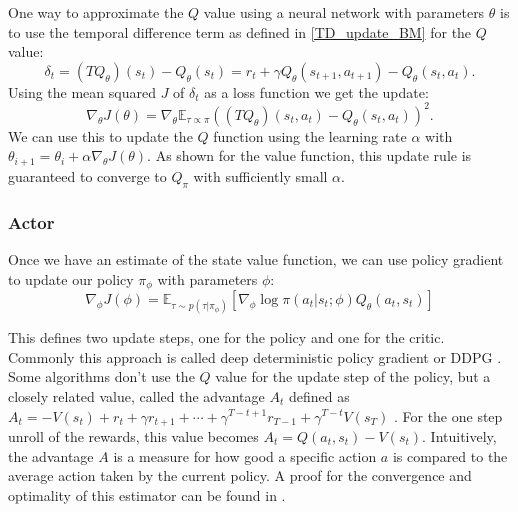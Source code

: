 One way to approximate the $Q$ value using a neural network with parameters $\theta$ is to use the temporal difference term as defined in \ref{TD_update_BM} for the $Q$ value:
\begin{equation}
    \label{Q-ValueTD}
    \delta_t = (T Q_{\theta})(s_t) - Q_{\theta}(s_t) = r_t + \gamma Q_{\theta}(s_{t+1}, a_{t+1}) - Q_{\theta}(s_{t}, a_{t}).
\end{equation}
Using the mean squared $J$ of $\delta_t$ as a loss function we get the update:
\begin{equation}
    \nabla_{\theta} J(\theta) = \nabla_{\theta} \mathbb{E}_{\tau \propto \pi}((T Q_{\theta})(s_t, a_t) - Q_{\theta}(s_t, a_t))^2.
\end{equation}
We can use this to update the $Q$ function using the learning rate $\alpha$ with $\theta_{i+1} = \theta_i + \alpha \nabla_{\theta} J(\theta)$. As shown for the value 
function, this update rule is guaranteed to converge to $Q_{\pi}$ with sufficiently small $\alpha$.

\subsubsection{Actor}
Once we have an estimate of the state value function, we can use policy gradient to update our policy $\pi_{\phi}$ with parameters $\phi$:
\begin{equation}
    \label{AC_general_update}
    \nabla_{\phi} J(\phi) = \mathbb{E}_{\tau \sim p(\tau | \pi_{\phi})} \left[\nabla_{\phi} \log \pi(a_t|s_t;\phi) Q_{\theta}(a_t, s_t) \right]
\end{equation}

This defines two update steps, one for the policy and one for the critic. Commonly this approach is called deep deterministic policy gradient or DDPG \cite{lillicrap2019continuous}. 
Some algorithms don't use the $Q$ value for the update step of the policy, but a closely 
related value, called the advantage $A_t$ defined as $A_t = -V(s_t) + r_t + \gamma r_{t+1} + \cdots + \gamma^{T-t+1} r_{T-1} + \gamma^{T-t} V(s_T)$ \cite{A2C}. For the one step 
unroll of the rewards, this value becomes $A_t = Q(a_t, s_t) - V(s_t)$. 
Intuitively, the advantage $A$ is a measure for how good a specific action $a$ is compared to the average action taken by the current policy. 
A proof for the convergence and optimality of this estimator can be found in \cite{proof_A}.

